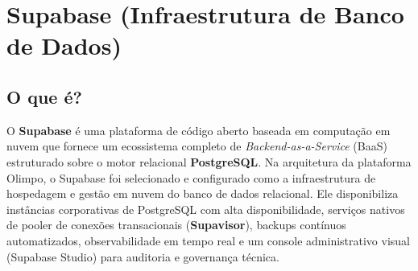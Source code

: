 \documentclass[12pt,a4paper]{article}
\begin{document}
\section{Supabase (Infraestrutura de Banco de Dados)}

\subsection{O que é?}
O \textbf{Supabase} é uma plataforma de código aberto baseada em computação em nuvem que fornece um ecossistema completo de \textit{Backend-as-a-Service} (BaaS) estruturado sobre o motor relacional \textbf{PostgreSQL}. Na arquitetura da plataforma Olimpo, o Supabase foi selecionado e configurado como a infraestrutura de hospedagem e gestão em nuvem do banco de dados relacional. Ele disponibiliza instâncias corporativas de PostgreSQL com alta disponibilidade, serviços nativos de pooler de conexões transacionais (\textbf{Supavisor}), backups contínuos automatizados, observabilidade em tempo real e um console administrativo visual (Supabase Studio) para auditoria e governança técnica.
\end{document}
